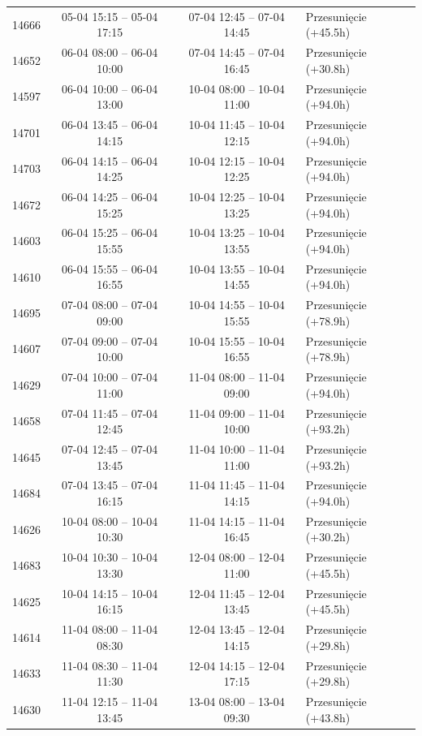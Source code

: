 \begin{table}[htbp]
\begin{tabular}{|r|c|c|l|}
14666 & 05-04 15:15 -- 05-04 17:15 & 07-04 12:45 -- 07-04 14:45 & Przesunięcie (+45.5h) \\ 
14652 & 06-04 08:00 -- 06-04 10:00 & 07-04 14:45 -- 07-04 16:45 & Przesunięcie (+30.8h) \\ 
14597 & 06-04 10:00 -- 06-04 13:00 & 10-04 08:00 -- 10-04 11:00 & Przesunięcie (+94.0h) \\ 
14701 & 06-04 13:45 -- 06-04 14:15 & 10-04 11:45 -- 10-04 12:15 & Przesunięcie (+94.0h) \\ 
14703 & 06-04 14:15 -- 06-04 14:25 & 10-04 12:15 -- 10-04 12:25 & Przesunięcie (+94.0h) \\ 
14672 & 06-04 14:25 -- 06-04 15:25 & 10-04 12:25 -- 10-04 13:25 & Przesunięcie (+94.0h) \\ 
14603 & 06-04 15:25 -- 06-04 15:55 & 10-04 13:25 -- 10-04 13:55 & Przesunięcie (+94.0h) \\ 
14610 & 06-04 15:55 -- 06-04 16:55 & 10-04 13:55 -- 10-04 14:55 & Przesunięcie (+94.0h) \\ 
14695 & 07-04 08:00 -- 07-04 09:00 & 10-04 14:55 -- 10-04 15:55 & Przesunięcie (+78.9h) \\ 
14607 & 07-04 09:00 -- 07-04 10:00 & 10-04 15:55 -- 10-04 16:55 & Przesunięcie (+78.9h) \\ 
14629 & 07-04 10:00 -- 07-04 11:00 & 11-04 08:00 -- 11-04 09:00 & Przesunięcie (+94.0h) \\ 
14658 & 07-04 11:45 -- 07-04 12:45 & 11-04 09:00 -- 11-04 10:00 & Przesunięcie (+93.2h) \\ 
14645 & 07-04 12:45 -- 07-04 13:45 & 11-04 10:00 -- 11-04 11:00 & Przesunięcie (+93.2h) \\ 
14684 & 07-04 13:45 -- 07-04 16:15 & 11-04 11:45 -- 11-04 14:15 & Przesunięcie (+94.0h) \\ 
14626 & 10-04 08:00 -- 10-04 10:30 & 11-04 14:15 -- 11-04 16:45 & Przesunięcie (+30.2h) \\ 
14683 & 10-04 10:30 -- 10-04 13:30 & 12-04 08:00 -- 12-04 11:00 & Przesunięcie (+45.5h) \\ 
14625 & 10-04 14:15 -- 10-04 16:15 & 12-04 11:45 -- 12-04 13:45 & Przesunięcie (+45.5h) \\ 
14614 & 11-04 08:00 -- 11-04 08:30 & 12-04 13:45 -- 12-04 14:15 & Przesunięcie (+29.8h) \\ 
14633 & 11-04 08:30 -- 11-04 11:30 & 12-04 14:15 -- 12-04 17:15 & Przesunięcie (+29.8h) \\ 
14630 & 11-04 12:15 -- 11-04 13:45 & 13-04 08:00 -- 13-04 09:30 & Przesunięcie (+43.8h) \\ 

\end{tabular}
\end{table}
